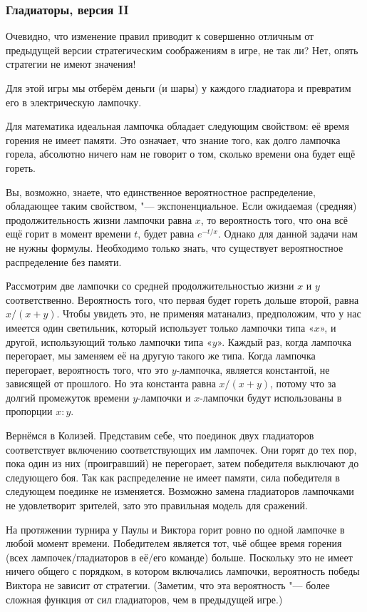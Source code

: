\documentclass[twoside]{book}
\begin{document}
\subsubsection*{Гладиаторы, версия II}%

Очевидно, что изменение правил приводит к совершенно отличным от предыдущей версии стратегическим соображениям в игре, не так ли? Нет, опять стратегии не имеют значения!

\medskip

Для этой игры мы отберём деньги (и шары) у каждого гладиатора и превратим его
в электрическую лампочку.

Для математика идеальная лампочка обладает следующим свойством: её время горения не имеет памяти.
Это означает, что знание того, как долго лампочка горела, абсолютно ничего нам не говорит о том, сколько времени она будет ещё гореть.

Вы, возможно, знаете, что единственное вероятностное распределение, обладающее таким свойством, "--- экспоненциальное.
Если ожидаемая (средняя) продолжительность жизни лампочки равна $x$, то вероятность того, что она всё ещё горит в момент времени $t$, будет равна $e^{-t/x}$.
Однако для данной задачи нам не нужны формулы.
Необходимо только знать, что существует вероятностное распределение без памяти.

Рассмотрим две лампочки со средней продолжительностью жизни $x$ и $y$ соответственно.
Вероятность того, что первая будет гореть дольше второй, равна $x/(x+y)$.
Чтобы увидеть это, не применяя матанализ, предположим, что у нас имеется один светильник, который использует только лампочки типа «$x$», и другой, использующий только лампочки типа «$y$».
Каждый раз, когда лампочка перегорает, мы заменяем её на другую такого же типа.
Когда лампочка перегорает, вероятность того, что это $y$-лампочка, является константой, не зависящей от прошлого.
Но эта константа равна $x/(x+y)$, потому что за долгий промежуток времени $y$-лампочки и $x$-лампочки будут использованы в пропорции $x : y$.

Вернёмся в Колизей.
Представим себе, что поединок двух гладиаторов соответствует включению соответствующих им лампочек.
Они горят до тех пор, пока один из них (проигравший) не перегорает, затем победителя выключают до следующего боя.
Так как распределение не имеет памяти, сила победителя в следующем поединке не изменяется.
Возможно замена гладиаторов лампочками не удовлетворит зрителей, зато это правильная модель для сражений.

На протяжении турнира у Паулы и Виктора горит ровно по одной лампочке в любой момент времени.
Победителем является тот, чьё общее время горения (всех лампочек/гладиаторов в её/его команде) больше.
Поскольку это не имеет ничего общего с порядком, в котором включались лампочки, вероятность победы Виктора не зависит от стратегии.
(Заметим, что эта вероятность "--- более сложная функция от сил гладиаторов, чем в предыдущей игре.)
\heart
\end{document}
